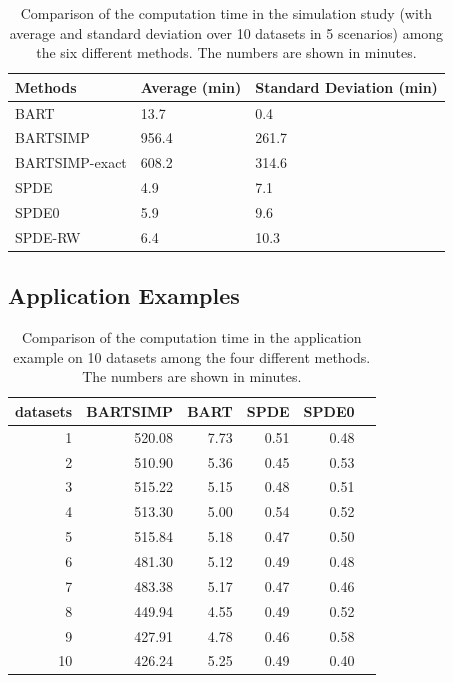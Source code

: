 \documentclass{article}
\begin{document}
\begin{table}[H]
\centering
\begin{tabular}{lll}
\toprule
Methods & Average (min) & Standard Deviation (min)\\
\midrule
BART & 13.7 & 0.4\\
BARTSIMP & 956.4 & 261.7\\
BARTSIMP-exact & 608.2 & 314.6\\
SPDE & 4.9 & 7.1\\
SPDE0 & 5.9 & 9.6\\
SPDE-RW & 6.4 & 10.3\\
\bottomrule
\end{tabular}
\caption{Comparison of the computation time in the simulation study (with average and standard deviation over 10 datasets in 5 scenarios) among the six different methods. The numbers are shown in minutes.}
\end{table}

\subsection{Application Examples}

\begin{table}[H]
\centering
\begin{tabular}{rrrrrr}
  \hline
datasets & BARTSIMP & BART & SPDE & SPDE0 \\ 
  \hline
 1 & 520.08 & 7.73 & 0.51 & 0.48 \\ 
   2 & 510.90 & 5.36 & 0.45 & 0.53 \\ 
  3 & 515.22 & 5.15 & 0.48 & 0.51 \\ 
   4 & 513.30 & 5.00 & 0.54 & 0.52 \\ 
   5 & 515.84 & 5.18 & 0.47 & 0.50 \\ 
  6 & 481.30 & 5.12 & 0.49 & 0.48 \\ 
 7 & 483.38 & 5.17 & 0.47 & 0.46 \\ 
    8 & 449.94 & 4.55 & 0.49 & 0.52 \\ 
   9 & 427.91 & 4.78 & 0.46 & 0.58 \\ 
  10 & 426.24 & 5.25 & 0.49 & 0.40 \\ 
   \hline
\end{tabular}
\caption{Comparison of the computation time in the application example on 10 datasets among the four different methods. The numbers are shown in minutes.}
\end{table}
\end{document}
